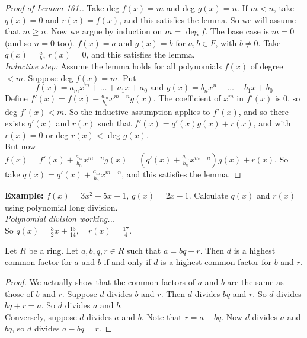 \begin{proof}[Proof of Lemma 161.]
	Take deg $f(x) = m$ and deg $g(x) = n$. If $m < n$, take $q(x) =0$ and $r(x) = f(x)$, and this satisfies the lemma. So we will assume that $m \geq n$. Now we argue by induction on $m = $ deg $f$. The base case is $m = 0$ (and so $n = 0$ too). $f(x) = a$ and $g(x) = b$ for $a,b \in F$, with $b \neq 0$. Take $q(x) = \frac{a}{b}$, $r(x) = 0$, and this satisfies the lemma.\\  
	\textit{Inductive step:} Assume the lemma holds for all polynomials $f(x)$ of degree $<m$. Suppose deg $f(x) = m$. Put \[f(x) = a_mx^m + \dots + a_1x + a_0 \text{ and } g(x) = b_nx^n + \dots + b_1x + b_0\] Define $f'(x) = f(x) - \frac{a_m}{b_n}x^{m-n}g(x)$. The coefficient of $x^m$ in $f'(x)$ is $0$, so deg $f'(x) < m$. So the inductive assumption applies to $f'(x)$, and so there exists $q'(x)$ and $r(x)$ such that $f'(x) = q'(x)g(x) + r(x)$, and with $r(x) = 0$ or deg $r(x) <$ deg $g(x)$.\vspace*{5pt}\\ But now $f(x) = f'(x) + \frac{a_m}{b_n}x^{m-n}g(x) = (q'(x) + \frac{a_m}{b_n}x^{m-n})g(x) + r(x).$ So take $q(x) = q'(x) + \frac{a_m}{b_n}x^{m-n}$, and this satisfies the lemma.
\end{proof}\vspace*{5pt}

\noindent \textbf{Example:} $f(x) = 3x^2 + 5x + 1$, $g(x)= 2x -1$. Calculate $q(x)$ and $r(x)$ using polynomial long division.\\

\textit{Polynomial division working...}\\

So $q(x) = \frac{3}{2}x + \frac{13}{14}, \quad r(x) = \frac{17}{4}$. \\

\begin{proposition} Let $R$ be a ring. Let $a,b,q,r \in R$ such that $a = bq + r$. Then $d$ is a highest common factor for $a$ and $b$ if and only if $d$ is a highest common factor for $b$ and $r$.	
\end{proposition}

\begin{proof}
We actually show that the common factors of $a$ and $b$ are the same as those of $b$ and $r$. Suppose $d$ divides $b$ and $r$. Then $d$ divides $bq$ and $r$. So $d$ divides $bq + r = a$. So $d$ divides $a$ and $b$.\\
Conversely, suppose $d$ divides $a$ and $b$. Note that $r = a - bq$. Now $d$ divides $a$ and $bq$, so $d$ divides $a - bq = r$.	
\end{proof}\vspace*{5pt}

